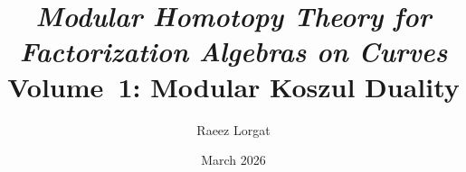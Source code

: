 \documentclass[11pt]{memoir}
\title{\textit{Modular Homotopy Theory for Factorization Algebras on Curves}\\[0.5em]\large Volume~1: Modular Koszul Duality}
\author{Raeez Lorgat}
\date{March 2026}
\begin{document}
\providecommand{\Aut}{\operatorname{Aut}}
\providecommand{\mathbbm}[1]{\mathbb{#1}}
\providecommand{\bigboxtimes}{\mathop{\boxtimes}\displaylimits}
\providecommand{\Bbar}{\bar{B}}
\providecommand{\B}{\bar{B}}
\providecommand{\Det}{\mathrm{Det}}
\providecommand{\Cobar}{\Omega}
\providecommand{\gr}{\operatorname{gr}}
\providecommand{\DR}{\mathrm{DR}}
\providecommand{\im}{\operatorname{im}}
\providecommand{\ad}{\operatorname{ad}}
\providecommand{\id}{\mathrm{id}}
\providecommand{\dlog}{d\log}
\providecommand{\otim}{\otimes}
\providecommand{\normord}[1]{:{#1}:}
\providecommand{\Bl}{\operatorname{Bl}}
\providecommand{\shuffle}{\mathbin{\amalg}}
\providecommand{\STATE}{\State}
\providecommand{\FOR}{\For}
\providecommand{\ENDFOR}{\EndFor}
\providecommand{\bA}{\mathbb{A}}
\providecommand{\bC}{\mathbb{C}}
\providecommand{\bF}{\mathbb{F}}
\providecommand{\bP}{\mathbb{P}}
\providecommand{\bZ}{\mathbb{Z}}
\providecommand{\bR}{\mathbb{R}}
\providecommand{\bQ}{\mathbb{Q}}
\providecommand{\bG}{\mathbb{G}}
\providecommand{\cC}{\mathcal{C}}
\providecommand{\cD}{\mathcal{D}}
\providecommand{\cH}{\mathcal{H}}
\providecommand{\cM}{\mathcal{M}}
\providecommand{\cO}{\mathcal{O}}
\providecommand{\cP}{\mathcal{P}}
\providecommand{\cN}{\mathcal{N}}
\providecommand{\cL}{\mathcal{L}}
\providecommand{\fS}{\mathfrak{S}}
\providecommand{\fg}{\mathfrak{g}}
\providecommand{\Hch}{H^{\mathrm{ch}}}
\providecommand{\CC}{\mathcal{C}}
\providecommand{\Cat}{\mathsf{Cat}}
\providecommand{\Catinf}{\mathsf{Cat}_\infty}
\providecommand{\Spc}{\mathsf{Spc}}
\providecommand{\dgVect}{\mathsf{dgVect}}
\providecommand{\grVect}{\mathsf{grVect}}
\providecommand{\Shv}{\mathsf{Shv}}
\providecommand{\Perv}{\mathsf{Perv}}
\providecommand{\PrL}{\mathsf{Pr}^\mathrm{L}}
\providecommand{\PrR}{\mathsf{Pr}^\mathrm{R}}
\providecommand{\Map}{\operatorname{Map}}
\providecommand{\holim}{\operatorname{holim}}
\providecommand{\hocolim}{\operatorname{hocolim}}
\providecommand{\VD}{\mathbb{D}}
\providecommand{\Sol}{\mathrm{Sol}}
\providecommand{\coOp}{\mathrm{coOp}}
\providecommand{\Opinfty}{\mathrm{Op}_\infty}
\providecommand{\Tw}{\mathrm{Tw}}
\providecommand{\CE}{\mathrm{CE}}
\providecommand{\fib}{\operatorname{fib}}
\providecommand{\cofib}{\operatorname{cofib}}
\providecommand{\CoDer}{\operatorname{CoDer}}



\maketitle
\end{document}
